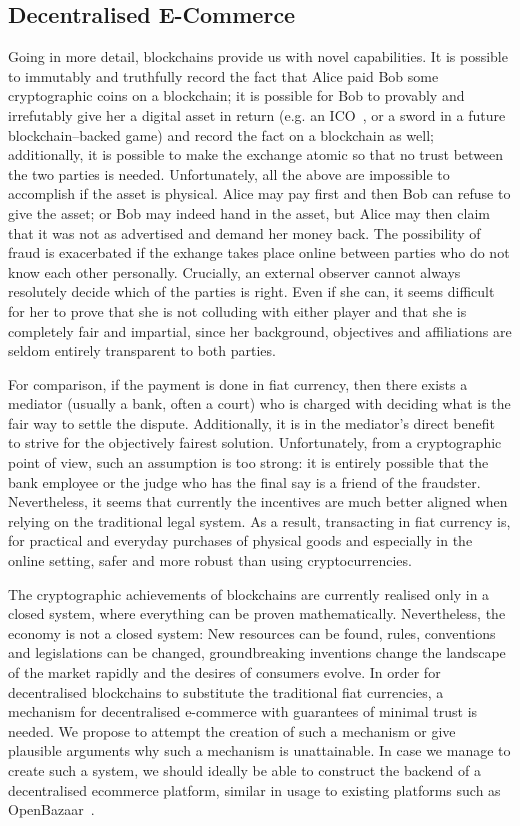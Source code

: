 \subsection{Decentralised E-Commerce}
  Going in more detail, blockchains provide us with novel capabilities. It is possible to
  immutably and truthfully record the fact that Alice paid Bob some cryptographic coins on
  a blockchain; it is possible for Bob to provably and irrefutably give her a digital
  asset in return (e.g. an ICO~\cite{eos}, or a sword in a future blockchain--backed game)
  and record the fact on a blockchain as well; additionally, it is possible to make the
  exchange atomic so that no trust between the two parties is needed. Unfortunately, all
  the above are impossible to accomplish if the asset is physical. Alice may pay first and
  then Bob can refuse to give the asset; or Bob may indeed hand in the asset, but Alice
  may then claim that it was not as advertised and demand her money back. The possibility
  of fraud is exacerbated if the exhange takes place online between parties who do not
  know each other personally. Crucially, an external observer cannot always resolutely
  decide which of the parties is right. Even if she can, it seems difficult for her to
  prove that she is not colluding with either player and that she is completely fair and
  impartial, since her background, objectives and affiliations are seldom entirely
  transparent to both parties.

  For comparison, if the payment is done in fiat currency, then there exists a mediator
  (usually a bank, often a court) who is charged with deciding what is the fair way to
  settle the dispute. Additionally, it is in the mediator's direct benefit to strive for
  the objectively fairest solution. Unfortunately, from a cryptographic point of view,
  such an assumption is too strong: it is entirely possible that the bank employee or the
  judge who has the final say is a friend of the fraudster. Nevertheless, it seems that
  currently the incentives are much better aligned when relying on the traditional legal
  system. As a result, transacting in fiat currency is, for practical and everyday
  purchases of physical goods and especially in the online setting, safer and more robust
  than using cryptocurrencies.

  The cryptographic achievements of blockchains are currently realised only in a closed
  system, where everything can be proven mathematically. Nevertheless, the economy is not
  a closed system: New resources can be found, rules, conventions and legislations can be
  changed, groundbreaking inventions change the landscape of the market rapidly and the
  desires of consumers evolve. In order for decentralised blockchains to substitute the
  traditional fiat currencies, a mechanism for decentralised e-commerce with guarantees of
  minimal trust is needed. We propose to attempt the creation of such a mechanism or give
  plausible arguments why such a mechanism is unattainable. In case we manage to create
  such a system, we should ideally be able to construct the backend of a decentralised
  ecommerce platform, similar in usage to existing platforms such as
  OpenBazaar~\cite{openbazaar}.

